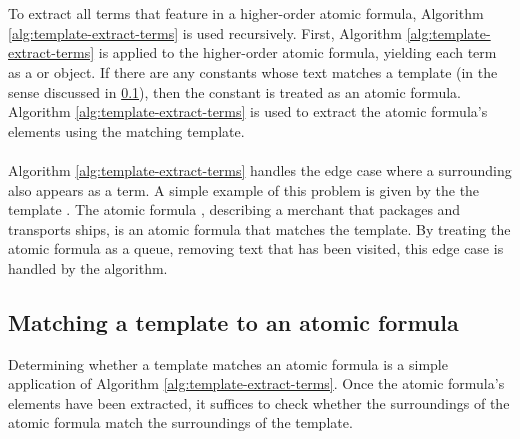 \documentclass[../main.tex]{subfiles}
\begin{document}
\\
\\
To extract all terms that feature in a higher-order atomic formula, Algorithm \ref{alg:template-extract-terms} is used recursively. First, Algorithm \ref{alg:template-extract-terms} is applied to the higher-order atomic formula, yielding each term as a  or  object. If there are any constants whose text matches a template (in the sense discussed in \ref{section:matching-template-formula}), then the constant is treated as an atomic formula. Algorithm \ref{alg:template-extract-terms} is used to extract the atomic formula's elements using the matching template.
\\
\\

Algorithm \ref{alg:template-extract-terms} handles the edge case where a surrounding also appears as a term. A simple example of this problem is given by the the template . The atomic formula , describing a merchant that packages and transports ships, is an atomic formula that matches the template. By treating the atomic formula as a queue, removing text that has been visited, this edge case is handled by the algorithm.

\subsection{Matching a template to an atomic formula}
\label{section:matching-template-formula}
Determining whether a template matches an atomic formula is a simple application of Algorithm \ref{alg:template-extract-terms}. Once the atomic formula's elements have been extracted, it suffices to check whether the surroundings of the atomic formula match the surroundings of the template.
\end{document}
